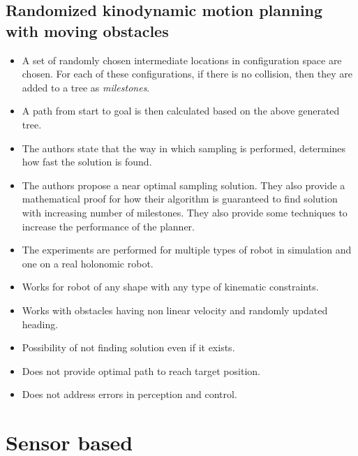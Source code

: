 \documentclass[11pt]{article}
\begin{document}
\subsection{Randomized kinodynamic motion planning with moving obstacles\cite{hsu2002randomized}}
\begin{itemize}
    \item A set of randomly chosen intermediate locations in configuration space are chosen. For each of these configurations, if there is no collision, then they are added to a tree as \textit{milestones}.
    \item A path from start to goal is then calculated based on the above generated tree.
    \item The authors state that the way in which sampling is performed, determines how fast the solution is found.
    \item The authors propose a near optimal sampling solution. They also provide a mathematical proof for how their algorithm is guaranteed to find solution with increasing number of milestones. They also provide some techniques to increase the performance of the planner.
    \item The experiments are performed for multiple types of robot in simulation and one on a real holonomic robot. 
        \color{green}
    \item Works for robot of any shape with any type of kinematic constraints.
    \item Works with obstacles having non linear velocity and randomly updated heading.
        \color{red}
    \item Possibility of not finding solution even if it exists.
    \item Does not provide optimal path to reach target position.
    \item Does not address errors in perception and control.
        \color{black}
\end{itemize}

\section{Sensor based}
\end{document}
